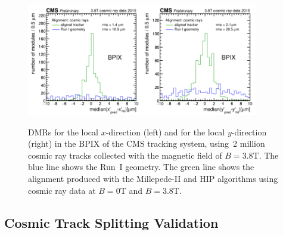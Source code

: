 \begin{figure}[htb]
    \begin{center}
        \includegraphics[width=0.45\textwidth]{../figs/Alignment/AlRes_CRAFT_DmedianR_BPIX_plain.png}\includegraphics[width=0.45\textwidth]{../figs/Alignment/AlRes_CRAFT_DmedianYR_BPIX_plain.png}
    \end{center}
    \caption {DMRs for the local $x$-direction (left) and for the local $y$-direction (right) in the BPIX of the CMS tracking system, using~2 million cosmic ray tracks collected with the magnetic field of $B=3.8$T. The blue line shows the Run~I geometry. The green line shows the alignment produced with the Millepede-II and HIP algorithms using cosmic ray data at $B=0$T and $B=3.8$T.}
    \label{fig:DMRs}
\end{figure}

\subsection{Cosmic Track Splitting Validation}
\label{sec:AlRes_trackSplit}

